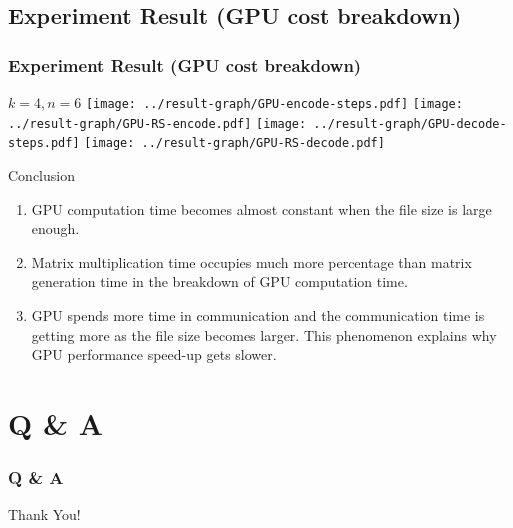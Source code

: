 \documentclass[slidestop,compress,mathserif]{beamer}
\begin{document}
\subsection{Experiment Result (GPU cost breakdown)} %
\begin{frame}[options]
\frametitle{Experiment Result (GPU cost breakdown)}
{
$k = 4, n = 6$
}
{
\texttt{[image: ../result-graph/GPU-encode-steps.pdf]}
}
{
\texttt{[image: ../result-graph/GPU-RS-encode.pdf]}
}
{
\texttt{[image: ../result-graph/GPU-decode-steps.pdf]}
}
{
\texttt{[image: ../result-graph/GPU-RS-decode.pdf]}
}
{
\begin{block}{Conclusion}
\begin{enumerate}
\item GPU computation time becomes almost constant when the file size is large enough.
\item Matrix multiplication time occupies much more percentage than matrix generation time in the breakdown of GPU computation time.
\item GPU spends more time in communication and the communication time is getting more as the file size becomes larger. This phenomenon explains why GPU performance speed-up gets slower.
\end{enumerate}
\end{block}
}
\end{frame}

\section{Q \& A} %
\begin{frame}[options]
\frametitle{Q \& A}
      \begin{center}
        Thank You!
      \end{center}
\end{frame}



\end{document}
